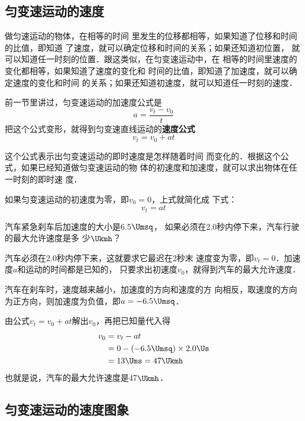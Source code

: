 \subsection{匀变速运动的速度}

做匀速运动的物体，在相等的时间
里发生的位移都相等，如果知道了位移和时间的比值，即知道
了速度，就可以确定位移和时间的关系；如果还知道初位置，
就可以知道任一时刻的位置．跟这类似，在匀变速运动中，在
相等的时间里速度的变化都相等，如果知道了速度的变化和
时间的比值，即知道了加速度，就可以确定速度的变化和时间
的关系；如果还知道初速度，就可以知道任一时刻的速度．

    前一节里讲过，匀变速运动的加速度公式是
\[a=\frac{v_t-v_0}{t} \]
把这个公式变形，就得到匀变速直线运动的\textbf{速度公式}
\[v_t=v_0+at \]

    这个公式表示出匀变速运动的即时速度是怎样随着时间
而变化的．根据这个公式，如果已经知道做匀变速运动的物
体的初速度和加速度，就可以求出物体在任一时刻的即时速
度．

    如果匀变速运动的初速度为零，即$v_0=0$，上式就简化成
下式：
\[v_t=at \]


\begin{example}
汽车紧急刹车后加速度的大小是6.5$\Umsq$，
如果必须在2.0秒内停下来，汽车行驶的最大允许速度是多
少$\Ukmh$？
\end{example}

\begin{solution}
    汽车必须在2.0秒内停下来，这就要求它最迟在2秒末
速度变为零，即$v_t=0$．加速度$a$和运动的时间都是已知的，
只要求出初速度$v_0$，就得到汽车的最大允许速度．

    汽车在刹车时，速度越来越小，加速度的方向和速度的方
向相反，取速度的方向为正方向，则加速度为负值，即$a=-
6.5\Umsq$．

    由公式$v_t=v_0+at$解出$v_0$，再把已知量代入得
\[\begin{split}
v_0&=v_t-at\\
&=0-(-6.5 \Umsq )\times 2.0 \Us \\
&=13 \Ums=47 \Ukmh
\end{split} \]
也就是说，汽车的最大允许速度是47$\Ukmh$．
\end{solution}


\subsection{匀变速运动的速度图象}


